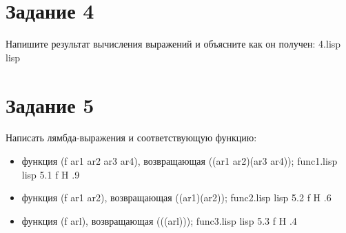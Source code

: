 \section{Задание 4}
Напишите результат вычисления выражений и объясните как он получен:
{4.lisp}
{lisp}
{}

\section{Задание 5}
Написать лямбда-выражения и соответствующую функцию:
\begin{itemize}
	\item функция (f ar1 ar2 ar3 ar4), возвращающая ((ar1 ar2)(ar3 ar4));
	{func1.lisp}
	{lisp}
	{}
	{5.1}
	{f}
	{H}
	{.9\textwidth}
	{}
	\item функция (f ar1 ar2), возвращающая ((ar1)(ar2));
	{func2.lisp}
	{lisp}
	{}
	{5.2}
	{f}
	{H}
	{.6\textwidth}
	{}
	\clearpage
	\item функция (f arl), возвращающая (((arl)));
	{func3.lisp}
	{lisp}
	{}
	{5.3}
	{f}
	{H}
	{.4\textwidth}
	{}
\end{itemize}